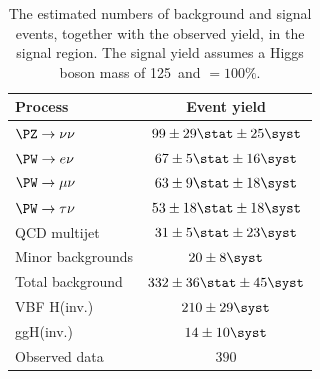 \begin{table}
  \caption{The estimated numbers of background and signal events, together with the observed yield, in the signal region. The signal yield assumes a Higgs boson mass of 125 \GeV\,and \BRinv$=100\%$.}
  \label{tab:promptresults}
  \begin{tabular}{lc}
    \hline
    \hline
    Process & Event yield \\
    \hline
    \hline
    $\PZ\rightarrow\nu\nu$ & $99\pm 29\stat\pm 25\syst$ \\
    $\PW\rightarrow e\nu$ & $67\pm 5\stat\pm 16\syst$ \\
    $\PW\rightarrow\mu\nu$ & $63\pm 9\stat\pm 18\syst$ \\
    $\PW\rightarrow\tau\nu$ & $53\pm 18\stat\pm 18\syst$ \\
    QCD multijet & $31\pm 5\stat\pm 23\syst$ \\
    Minor backgrounds & $20\pm 8\syst$\\
    \hline 
    Total background & $332\pm 36\stat\pm 45\syst$ \\
    \hline
    \ac{VBF} H(inv.) & $210\pm 29\syst$ \\
    \ac{ggH}(inv.) & $14\pm 10\syst$ \\
    \hline 
    \hline
    Observed data & $390$ \\
    \hline
  \end{tabular}
\end{table}

